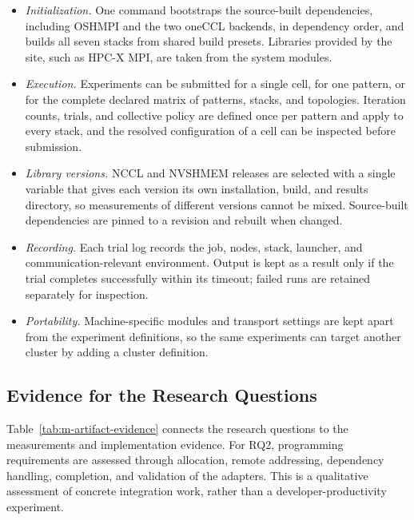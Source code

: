 \begin{itemize}
    \item \emph{Initialization.} One command bootstraps the source-built dependencies, including OSHMPI and the two oneCCL backends, in dependency order, and builds all seven stacks from shared build presets. Libraries provided by the site, such as HPC-X MPI, are taken from the system modules.
    \item \emph{Execution.} Experiments can be submitted for a single cell, for one pattern, or for the complete declared matrix of patterns, stacks, and topologies. Iteration counts, trials, and collective policy are defined once per pattern and apply to every stack, and the resolved configuration of a cell can be inspected before submission.
    \item \emph{Library versions.} NCCL and NVSHMEM releases are selected with a single variable that gives each version its own installation, build, and results directory, so measurements of different versions cannot be mixed. Source-built dependencies are pinned to a revision and rebuilt when changed.
    \item \emph{Recording.} Each trial log records the job, nodes, stack, launcher, and communication-relevant environment. Output is kept as a result only if the trial completes successfully within its timeout; failed runs are retained separately for inspection.
    \item \emph{Portability.} Machine-specific modules and transport settings are kept apart from the experiment definitions, so the same experiments can target another cluster by adding a cluster definition.
\end{itemize}

\subsection{Evidence for the Research Questions}\label{sec:research-evidence}

Table~\ref{tab:m-artifact-evidence} connects the research questions to the measurements and implementation evidence. For RQ2, programming requirements are assessed through allocation, remote addressing, dependency handling, completion, and validation of the adapters. This is a qualitative assessment of concrete integration work, rather than a developer-productivity experiment.

